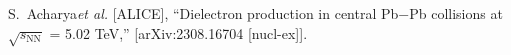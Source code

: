 S.~Acharya\textit{et al.} [ALICE],
``Dielectron production in central Pb$-$Pb collisions at $\sqrt{s_\mathrm{NN}}$ = 5.02 TeV,''
[arXiv:2308.16704 [nucl-ex]].


